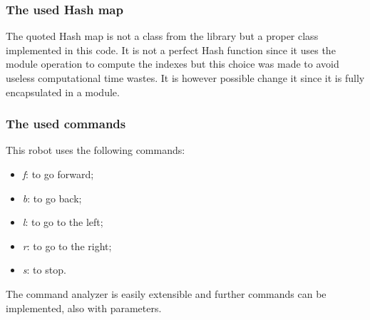 \subsubsection{The used Hash map}
The quoted Hash map is not a class from the library but a proper class implemented in this code. It is not a perfect Hash function since it uses the module operation to compute the indexes but this choice was made to avoid useless computational time wastes. It is however possible change it since it is fully encapsulated in a module.\\

\subsubsection{The used commands}
This robot uses the following commands:
\begin{itemize}
	\item \textit{f}: to go forward;
	\item \textit{b}: to go back;
	\item \textit{l}: to go to the left;
	\item \textit{r}: to go to the right;
	\item \textit{s}: to stop.
\end{itemize}
The command analyzer is easily extensible and further commands can be implemented, also with parameters.
\newpage

